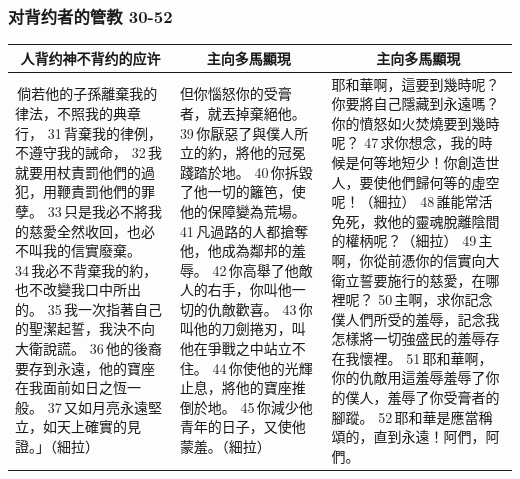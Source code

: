 \subsubsection{对背约者的管教 30-52}
\begin{table}[H]
\centering
\begin{tabular}{p{5.5cm}|p{}|p{6.75cm}}\hline\hline
\multicolumn{1}{c|}{人背约神不背约的应许}&\multicolumn{1}{c}{主向多馬顯現}&\multicolumn{1}{c}{主向多馬顯現}\\\hline
 倘若他的子孫離棄我的律法，不照我的典章行，
31 背棄我的律例，不遵守我的誡命，
32 我就要用杖責罰他們的過犯，用鞭責罰他們的罪孽。
33 只是我必不將我的慈愛全然收回，也必不叫我的信實廢棄。
34 我必不背棄我的約，也不改變我口中所出的。
35 我一次指著自己的聖潔起誓，我決不向大衛說謊。
36 他的後裔要存到永遠，他的寶座在我面前如日之恆一般。
37 又如月亮永遠堅立，如天上確實的見證。」（細拉）
&但你惱怒你的受膏者，就丟掉棄絕他。
39 你厭惡了與僕人所立的約，將他的冠冕踐踏於地。
40 你拆毀了他一切的籬笆，使他的保障變為荒場。
41 凡過路的人都搶奪他，他成為鄰邦的羞辱。
42 你高舉了他敵人的右手，你叫他一切的仇敵歡喜。
43 你叫他的刀劍捲刃，叫他在爭戰之中站立不住。
44 你使他的光輝止息，將他的寶座推倒於地。
45 你減少他青年的日子，又使他蒙羞。（細拉）
&耶和華啊，這要到幾時呢？你要將自己隱藏到永遠嗎？你的憤怒如火焚燒要到幾時呢？
47 求你想念，我的時候是何等地短少！你創造世人，要使他們歸何等的虛空呢！（細拉）
48 誰能常活免死，救他的靈魂脫離陰間的權柄呢？（細拉）
49 主啊，你從前憑你的信實向大衛立誓要施行的慈愛，在哪裡呢？
50 主啊，求你記念僕人們所受的羞辱，記念我怎樣將一切強盛民的羞辱存在我懷裡。
51 耶和華啊，你的仇敵用這羞辱羞辱了你的僕人，羞辱了你受膏者的腳蹤。
52 耶和華是應當稱頌的，直到永遠！阿們，阿們。\\\hline
\end{tabular}
\end{table} 
